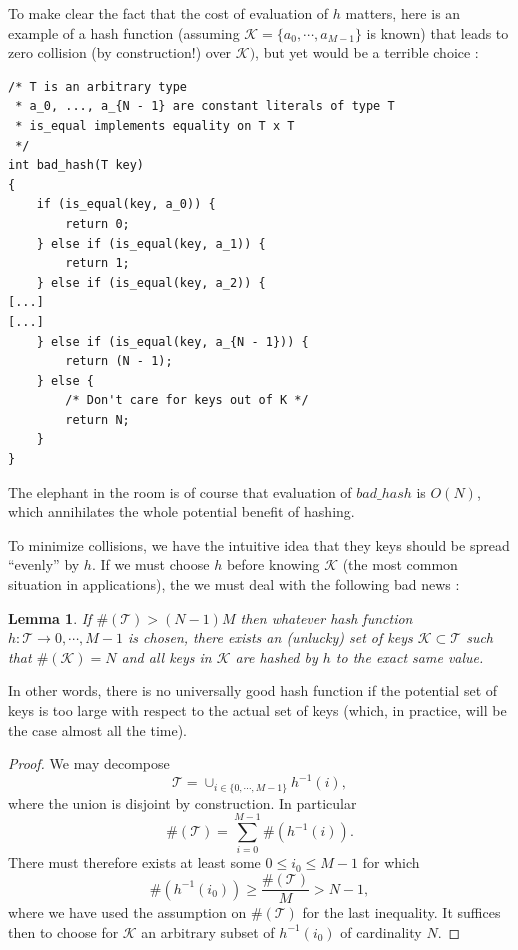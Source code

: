 \documentclass[12pt]{article}
\theoremstyle{plain}
\newtheorem{lemma}{Lemma}
\theoremstyle{remark}
\begin{document}
To make clear the fact that the cost of evaluation of $h$ matters, here is an example 
of a hash function (assuming $\mathcal{K} = \{a_0,\cdots, a_{M-1}\}$ is known) that 
leads to zero collision (by construction!) over $\mathcal{K})$, but yet would be
a terrible choice :

\begin{lstlisting}[style=C]
/* T is an arbitrary type
 * a_0, ..., a_{N - 1} are constant literals of type T
 * is_equal implements equality on T x T 
 */
int bad_hash(T key)
{
	if (is_equal(key, a_0)) {
		return 0;
	} else if (is_equal(key, a_1)) {
		return 1;
	} else if (is_equal(key, a_2)) {
[...]
[...]
	} else if (is_equal(key, a_{N - 1})) {
		return (N - 1);
	} else {
		/* Don't care for keys out of K */
		return N;
	}
}
\end{lstlisting}

The elephant in the room is of course that evaluation of $bad\_hash$ is $O(N)$,
which annihilates the whole potential benefit of hashing.

\medskip
To minimize collisions, we have the intuitive idea that they keys should be
spread ``evenly'' by $h$. If we must choose $h$ before knowing $\mathcal{K}$
(the most common situation in applications), the we must deal with the following
bad news :

\begin{lemma} If $\#(\mathcal{T}) > (N-1)M$ then whatever hash function $h
	:\mathcal{T} \to {0, \cdots, M-1}$ is chosen, there exists an (unlucky)
	set of keys $\mathcal{K} \subset \mathcal{T}$ such that $\#(\mathcal{K})
	= N$ and all keys in $\mathcal{K}$ are hashed by $h$ to the exact same
	value.
\end{lemma}

In other words, there is no universally good hash function if the potential set 
of keys is too large with respect to the actual set of keys (which, in practice, 
will be the case almost all the time).

\begin{proof}
We may decompose
$$
	\mathcal{T} = \cup_{i \in \{0,\cdots, M-1\}} h^{-1}(i),
$$
where the union is disjoint by construction. In particular
$$
	\#(\mathcal{T}) = \sum_{i=0}^{M-1} \#(h^{-1}(i)).
$$
There must therefore exists at least some $0 \leq i_0 \leq M-1$ for
which
$$
	\#(h^{-1}(i_0)) \geq \frac{\#(\mathcal{T})}{M} > N - 1,
$$
	where we have used the assumption on $\#(\mathcal{T})$ for the last
	inequality. It suffices then to choose for $\mathcal{K}$ an arbitrary
	subset of $h^{-1}(i_0)$ of cardinality $N$.
\end{proof}
\end{document}

